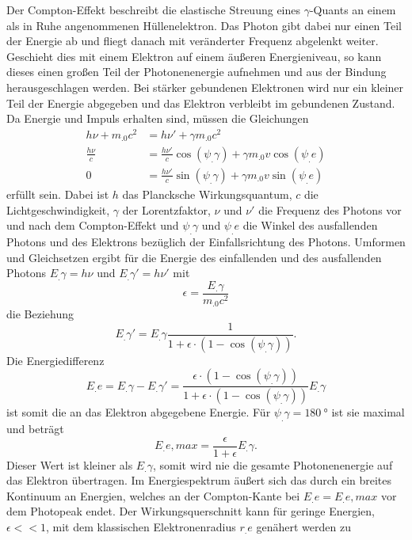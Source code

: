 Der Compton-Effekt beschreibt die elastische Streuung eines $\gamma$-Quants an einem als in Ruhe angenommenen Hüllenelektron. Das Photon gibt dabei nur einen Teil der Energie ab und fliegt danach mit veränderter Frequenz abgelenkt weiter. Geschieht dies mit einem Elektron auf einem äußeren Energieniveau, so kann dieses einen großen Teil der Photonenenergie aufnehmen und aus der Bindung herausgeschlagen werden. Bei stärker gebundenen Elektronen wird nur ein kleiner Teil der Energie abgegeben und das Elektron verbleibt im gebundenen Zustand.
Da Energie und Impuls erhalten sind, müssen die Gleichungen
\begin{align*}
h \nu + m_.0 c^2 &= h \nu '+ \gamma m_.0 c^2\\
\frac{h \nu}{c}&= \frac{h \nu '}{c}\cos(\psi_.{\gamma})+\gamma m_.0 v\cos(\psi_.e)\\
0&= \frac{h\nu '}{c}\sin(\psi_.{\gamma})+\gamma m_.0 v\sin(\psi_.e)
\end{align*}
erfüllt sein. Dabei ist $h$ das Plancksche Wirkungsquantum, $c$ die Lichtgeschwindigkeit, $\gamma$ der Lorentzfaktor, $\nu$ und $\nu '$ die Frequenz des Photons vor und nach dem Compton-Effekt und $\psi_.{\gamma}$ und $\psi_.e$ die Winkel des ausfallenden Photons und des Elektrons bezüglich der Einfallsrichtung des Photons.
Umformen und Gleichsetzen ergibt für die Energie des einfallenden und des ausfallenden Photons $E_.{\gamma}=h\nu$ und $E_.{\gamma}'=h\nu '$ mit \[\epsilon=\frac{E_.{\gamma}}{m_.0c^2}\] die Beziehung
\begin{equation}
E_.{\gamma}'= E_.{\gamma}\frac{1}{1+\epsilon\cdot\left(1-\cos(\psi_.{\gamma})\right)}\text{.}
\end{equation}
Die Energiedifferenz
\begin{equation}
E_.e=E_.{\gamma}-E_.{\gamma}' =\frac{\epsilon\cdot\left(1-\cos(\psi_.{\gamma})\right)}{1+\epsilon\cdot\left(1-\cos(\psi_.{\gamma})\right)}E_.{\gamma}
\end{equation}
ist somit die an das Elektron abgegebene Energie.
Für $\psi_.{\gamma}=\SI{180}{\degree}$ ist sie maximal und beträgt
\begin{equation}
E_.{e,max}=\frac{\epsilon}{1+\epsilon}E_.{\gamma}\text{.}\label{eq:Emax}
\end{equation}
Dieser Wert ist kleiner als $E_.{\gamma}$, somit wird nie die gesamte Photonenenergie auf das Elektron übertragen. Im Energiespektrum äußert sich das durch ein breites Kontinuum an Energien, welches an der Compton-Kante bei
$E_.e=E_.{e,max}$ vor dem Photopeak endet.
Der Wirkungsquerschnitt kann für geringe Energien, $\epsilon << 1$, mit dem klassischen Elektronenradius $r_.e$ genähert werden zu 
